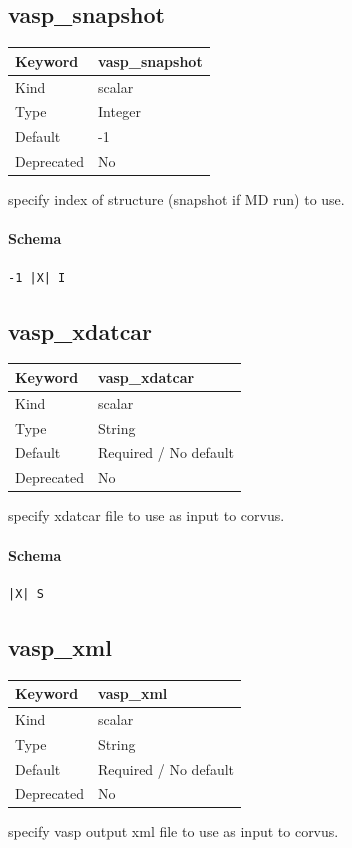 \documentclass[11pt]{article}
\begin{document}
\subsection{vasp\_snapshot}
\label{kw:vasp-snapshot}
\begin{longtable}{|p{1.5in}|p{4.5in}|}
\hline
Keyword & vasp\_snapshot \\
\hline
Kind & scalar \\
\hline
Type & Integer \\
\hline
Default & -1 \\
\hline
Deprecated & No \\
\hline
\end{longtable}
 specify index of structure (snapshot if MD run) to use.

\paragraph{Schema}
\begin{Verbatim}
-1 |X| I
\end{Verbatim}

\subsection{vasp\_xdatcar}
\label{kw:vasp-xdatcar}
\begin{longtable}{|p{1.5in}|p{4.5in}|}
\hline
Keyword & vasp\_xdatcar \\
\hline
Kind & scalar \\
\hline
Type & String \\
\hline
Default & Required / No default \\
\hline
Deprecated & No \\
\hline
\end{longtable}
 specify xdatcar file to use as input to corvus.

\paragraph{Schema}
\begin{Verbatim}
|X| S
\end{Verbatim}

\subsection{vasp\_xml}
\label{kw:vasp-xml}
\begin{longtable}{|p{1.5in}|p{4.5in}|}
\hline
Keyword & vasp\_xml \\
\hline
Kind & scalar \\
\hline
Type & String \\
\hline
Default & Required / No default \\
\hline
Deprecated & No \\
\hline
\end{longtable}
 specify vasp output xml file to use as input to corvus.
\end{document}
